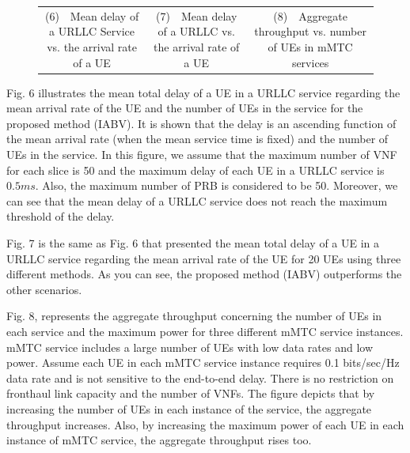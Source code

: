 \documentclass[lettersize,journal]{IEEEtran}
\begin{document}
\begin{figure}[!htb]
{\begin{tabular}{c@{}c@{}c}
			\scriptsize(6)~~Mean delay of a URLLC Service vs. the arrival rate of a UE  & \scriptsize(7)~~Mean delay of a URLLC  vs. the arrival rate of a UE  & \scriptsize(8)~~Aggregate throughput vs. number of UEs in mMTC services
	\end{tabular}}
	\label{label}
\end{figure}

Fig. 6 illustrates the mean total delay of a UE in a URLLC service regarding the mean arrival rate of the UE and the number of UEs in the service for the proposed method (IABV).
It is shown that the delay is an ascending function of the mean arrival rate (when the mean service time is fixed) and the number of UEs in the service. In this figure, we assume that the maximum number of VNF for each slice is 50 and the maximum delay of each UE in a URLLC service is $0.5ms$. Also, the maximum number of PRB is considered to be 50.
 Moreover, we can see that the mean delay of a URLLC service
does not reach the maximum threshold of the delay.

Fig. 7 is the same as Fig. 6 that presented the mean total delay of a UE in a URLLC service regarding the mean arrival rate of the UE for 20 UEs using three different methods. As you can see, the proposed method (IABV) outperforms the other scenarios.

Fig. 8, represents the aggregate throughput concerning the number of UEs in each service and the maximum power for three different mMTC service instances. mMTC service includes a large number of UEs with low data rates and low power.
Assume each UE in each mMTC service instance requires 0.1 bits/sec/Hz data rate and is not sensitive to the end-to-end delay. There is no restriction on fronthaul link capacity and the number of VNFs.
The figure depicts that by increasing the number of UEs in each instance of the service, the aggregate throughput increases.
Also, by increasing the maximum power of each UE in each instance of mMTC service, the aggregate throughput rises too.
\end{document}
